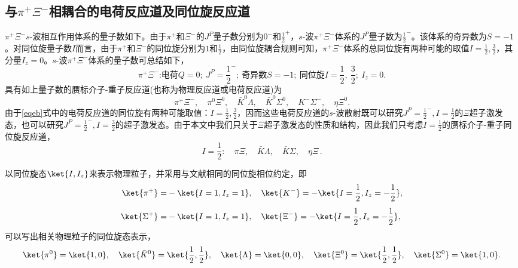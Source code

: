 \subsection{与$\pi^{+}\Xi^{-}$相耦合的电荷反应道及同位旋反应道}
$\pi^{+}\Xi^{-}$$s$-波相互作用体系的量子数如下。由于$\pi^{+}$和$\Xi^{-}$的$J^{P}$量子数分别为$0^{-}$和$\frac{1}{2}^{+}$，$s$-波$\pi^{+}\Xi^{-}$体系的$J^{P}$量子数为$\frac{1}{2}^{-}$。该体系的奇异数为$S=-1$。对同位旋量子数$I$而言，由于$\pi^{+}$和$\Xi^{-}$的同位旋分别为$1$和$\frac{1}{2}$，由同位旋耦合规则可知，$\pi^{+}\Xi^{-}$体系的总同位旋有两种可能的取值$I=\frac{1}{2},\frac{3}{2}$，其分量$I_{z}=0$。$s$-波$\pi^{+}\Xi^{-}$体系的量子数可总结如下，
\begin{equation*}
	\pi^{+}\Xi^{-}\text{:电荷}Q=0;\ J^{P}=\frac{1}{2}^{-};\ \text{奇异数}S=-1;\ \text{同位旋}I=\frac{1}{2},\ \frac{3}{2};\ I_{z}=0.
\end{equation*}
具有如上量子数的赝标介子-重子反应道(也称为物理反应道或电荷反应道)为
\begin{equation}
	\label{eqeb}
	\pi^{+}\Xi^{-},\quad\pi^{0}\Xi^{0},\quad \bar{K}^{0}\Lambda,\quad \bar{K}^{0}\Sigma^{0},\quad K^{-}\Sigma^{-},\quad \eta\Xi^{0}.
\end{equation}
由于\eqref{eqeb}式中的电荷反应道的同位旋有两种可能取值：$I=\frac{1}{2},\frac{3}{2}$，因而这些电荷反应道的$s$-波散射既可以研究$J^{P}=\frac{1}{2}^{-},I=\frac{1}{2}$的$\Xi$超子激发态，也可以研究$J^{P}=\frac{1}{2}^{-},I=\frac{3}{2}$的超子激发态。由于本文中我们只关于$\Xi$超子激发态的性质和结构，因此我们只考虑$I=\frac{1}{2}$的赝标介子-重子同位旋反应道，
\begin{equation}
	\label{eqib}
	I=\frac{1}{2}:\quad \pi\Xi,\quad \bar{K}\Lambda,\quad \bar{K}\Sigma,\quad \eta\Xi\,.
\end{equation}\par
以同位旋态$\ket{I,I_{z}}$来表示物理粒子，并采用与文献\cite{OSET199899}相同的同位旋相位约定，即
\begin{equation}
\begin{split}
	\ket{\pi^{+}}=&-\ket{I=1,I_{z}=1},\quad
	\ket{K^{-}}=-\ket{I=\frac{1}{2},I_{z}=-\frac{1}{2}},\\[1ex]
	\ket{\Sigma^{+}}=&-\ket{I=1,I_{z}=1},\quad
	\ket{\Xi^{-}}=-\ket{I=\frac{1}{2},I_{z}=-\frac{1}{2}},
\end{split}
\end{equation}
\vspace{-0.5cm}
可以写出相关物理粒子的同位旋态表示，
\begin{equation*}
	\ket{\pi^{0}}=\ket{1,0},\quad \ket{\bar{K}^{0}}=\ket{\frac{1}{2},\frac{1}{2}},\quad \ket{\Lambda}=\ket{0,0},\quad \ket{\Xi^{0}}=\ket{\frac{1}{2},\frac{1}{2}},\quad \ket{\Sigma^{0}}=\ket{1,0}.

\end{equation*}$$
